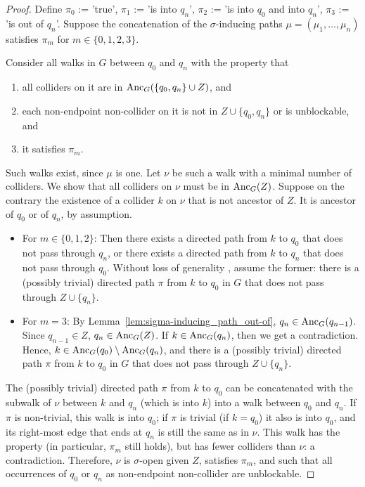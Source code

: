 \begin{proof}
  Define $\pi_0$ := 'true', $\pi_1$ := 'is into $q_n$', $\pi_2$ := 'is into $q_0$ and into $q_n$', $\pi_3$ := 'is out of $q_n$'.
  Suppose the concatenation of the $\sigma$-inducing paths $\mu = (\mu_1, \dots, \mu_n)$ satisfies $\pi_m$ for $m \in \{0,1,2,3\}$.

  Consider all walks in $G$ between $q_0$ and $q_n$ with the property that 
  \begin{enumerate}
    \item all colliders on it are in $\mathrm{Anc}_{G}({\{q_0,q_n\} \cup Z})$, and 
    \item each non-endpoint non-collider on it is not in $Z \cup \{q_0,q_n\}$ or is unblockable, and
    \item it satisfies $\pi_m$.
  \end{enumerate}
  Such walks exist, since $\mu$ is one. 
  Let $\nu$ be such a walk with a minimal number of colliders.
  We show that all colliders on $\nu$ must be in $\mathrm{Anc}_{G}(Z)$. 
  Suppose on the contrary the existence of a collider $k$ on $\nu$ that is not ancestor of $Z$. 
  It is ancestor of $q_0$ or of $q_n$, by assumption.

  \begin{itemize}
    \item For $m\in \{0,1,2\}$:
      Then there exists a directed path from $k$ to $q_0$ that does not pass through $q_n$, or there exists a directed path from $k$ to $q_n$ that does not pass through $q_0$.
      Without loss of generality , assume the former:
      there is a (possibly trivial) directed path $\pi$ from $k$ to $q_0$ in $G$ that does not pass through $Z \cup \{q_n\}$.
    \item For $m = 3$:
      By Lemma~\ref{lem:sigma-inducing_path_out-of}, $q_n \in \mathrm{Anc}_G(q_{n-1})$.
      Since $q_{n-1} \in Z$, $q_n \in \mathrm{Anc}_G(Z)$. 
      If $k \in \mathrm{Anc}_G(q_n)$, then we get a contradiction.
      Hence, $k \in \mathrm{Anc}_G(q_0) \setminus \mathrm{Anc}_G(q_n)$, and
      there is a (possibly trivial) directed path $\pi$ from $k$ to $q_0$ in $G$ that does not pass through $Z \cup \{q_n\}$.
  \end{itemize}
  
  The (possibly trivial) directed path $\pi$ from $k$ to $q_0$ can be concatenated with the subwalk of $\nu$ between $k$ and $q_n$ (which is into $k$) into a walk between $q_0$ and $q_n$.
  If $\pi$ is non-trivial, this walk is into $q_0$; if $\pi$ is trivial (if $k = q_0$) it also is into $q_0$, and its right-most edge that ends at $q_n$ is still the same as in $\nu$.
  This walk has the property (in particular, $\pi_m$ still holds), but has fewer colliders than $\nu$: a contradiction.
  Therefore, $\nu$ is $\sigma$-open given $Z$, satisfies $\pi_m$, and such that all occurrences of $q_0$ or $q_n$ as non-endpoint non-collider are unblockable.
\end{proof}

